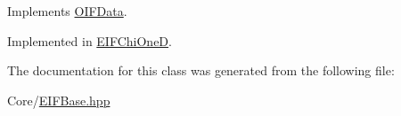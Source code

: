Implements \hyperlink{classOIFData_a12eef51d074a73b5b261c411e79cbb37}{OIFData}.



Implemented in \hyperlink{classEIFChiOneD_a014a763220034f5547c2d395b3508b8d}{EIFChiOneD}.



The documentation for this class was generated from the following file:\begin{DoxyCompactItemize}
\item 
Core/\hyperlink{EIFBase_8hpp}{EIFBase.hpp}\end{DoxyCompactItemize}
